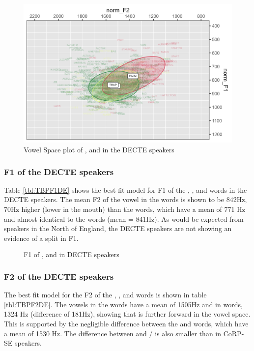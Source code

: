 \documentclass[../../../00.FullDoc/tex/ThesisSkeleton-draft2]{subfiles}
\begin{document}
\begin{figure}[h]
	\includegraphics[width=\textwidth]{../figures/TBP-DE-vplot.png}
	\caption{Vowel Space plot of \trap{},\bath{} and \palm{} in the DECTE speakers} \label{fig:TBPvplotDE}
\end{figure}



\subsubsection{F1 of the DECTE speakers}

Table \ref{tbl:TBPF1DE} shows the best fit model for F1 of the \trap{}, \bath{}, and \palm{} words in the DECTE speakers. The mean F2 of the vowel in the \bath{} words is shown to be 842Hz, 70Hz higher (lower in the mouth) than the \palm{} words, which have a mean of 771 Hz and almost identical to the \trap{} words (mean = 841Hz). As would be expected from speakers in the North of England, the DECTE speakers are not showing an evidence of a \TB{} split in F1.

\begin{figure}[h]
	
	\caption{F1 of \trap{}, \bath{} and \palm{}  in DECTE speakers} \label{fig:TBF1DE}
\end{figure}

\subsubsection{F2 of the DECTE speakers}
The best fit model for the F2 of the \trap{}, \bath{}, and \palm{} words is shown in table \ref{tbl:TBPF2DE}. The vowels in the \bath{} words have a mean of 1505Hz and  in \palm{} words, 1324 Hz (difference of 181Hz), showing that \bath{} is further forward in the vowel space. This is supported by the negligible difference between the \bath{} and \trap{} words, which have a mean of 1530 Hz. The difference between \palm{} and \trap{}/\bath{} is also smaller than in CoRP-SE speakers. 
\end{document}
